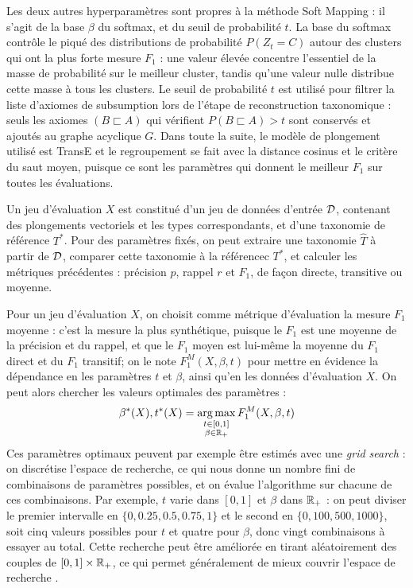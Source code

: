 Les deux autres hyperparamètres sont propres à la méthode Soft Mapping : il s'agit de la base $\beta$ du softmax, et du seuil de probabilité $t$. La base du softmax contrôle le piqué des distributions de probabilité $P(Z_t = C)$ autour des clusters qui ont la plus forte mesure $F_1$ : une valeur élevée concentre l'essentiel de la masse de probabilité sur le meilleur cluster, tandis qu'une valeur nulle distribue cette masse à tous les clusters. Le seuil de probabilité $t$ est utilisé pour filtrer la liste d'axiomes de subsumption lors de l'étape de reconstruction taxonomique : seuls les axiomes $(B \sqsubset A)$ qui vérifient $P(B \sqsubset A) > t$ sont conservés et ajoutés au graphe acyclique $G$. Dans toute la suite, le modèle de plongement utilisé est TransE et le regroupement se fait avec la distance cosinus et le critère du saut moyen, puisque ce sont les paramètres qui donnent le meilleur $F_1$ sur toutes les évaluations. 

Un jeu d'évaluation $X$ est constitué d'un jeu de données d'entrée $\cal{D}$, contenant des plongements vectoriels et les types correspondants, et d'une taxonomie de référence $T^*$. Pour des paramètres fixés, on peut extraire une taxonomie $\hat{T}$ à partir de $\cal{D}$, comparer cette taxonomie à la référencec $T^*$, et calculer les métriques précédentes : précision $p$, rappel $r$ et $F_1$, de façon directe, transitive ou moyenne. 

Pour un jeu d'évaluation $X$, on choisit comme métrique d'évaluation la mesure $F_1$ moyenne : c'est la mesure la plus synthétique, puisque le $F_1$ est une moyenne de la précision et du rappel, et que le $F_1$ moyen est lui-même la moyenne du $F_1$ direct et du $F_1$ transitif; on le note $F_1^M(X, \beta, t)$ pour mettre en évidence la dépendance en les paramètres $t$ et $\beta$, ainsi qu'en les données d'évaluation $X$.
On peut alors chercher les valeurs optimales des paramètres :
\begin{equation}
  \beta^*(X), t^*(X) = \argmax_{\substack{t \in [0, 1] \\ \beta \in \R_+}} F_1^M(X, \beta, t)
\end{equation}
Ces paramètres optimaux peuvent par exemple être estimés avec une \textit{grid search} : on discrétise l'espace de recherche, ce qui nous donne un nombre fini de combinaisons de paramètres possibles, et on évalue l'algorithme sur chacune de ces combinaisons. Par exemple, $t$ varie dans $[0, 1]$ et $\beta$ dans $\R_+$ : on peut diviser le premier intervalle en $\{0, 0.25, 0.5, 0.75, 1\}$ et le second en $\{0, 100, 500, 1000 \}$, soit cinq valeurs possibles pour $t$ et quatre pour $\beta$, donc vingt combinaisons à essayer au total. Cette recherche peut être améliorée en tirant aléatoirement des couples de $[0, 1] \times \R_+$, ce qui permet généralement de mieux couvrir l'espace de recherche \cite{bergstra2012random}.

